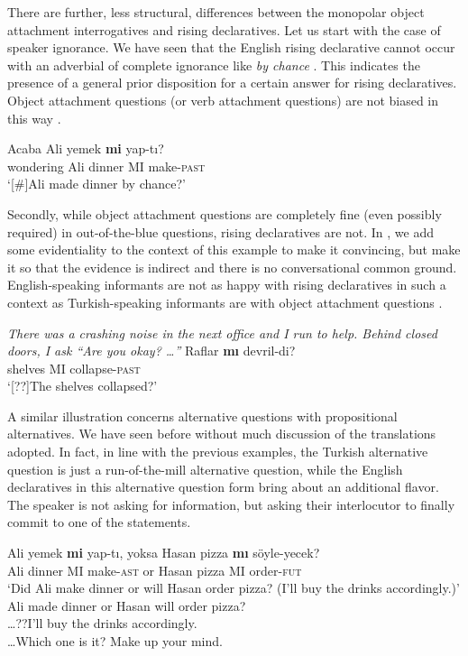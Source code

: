 \documentclass[output=paper,colorlinks,citecolor=brown]{langscibook}
\begin{document}
There are further, less structural, differences between the monopolar object attachment interrogatives and rising declaratives. Let us start with the case of speaker ignorance. We have seen that the English rising declarative cannot occur with an adverbial of complete ignorance like \textit{by chance} \citep{gunlogson} . This indicates the presence of a general prior disposition for a certain answer for rising declaratives. Object attachment questions (or verb attachment questions) are not biased in this way . 

\ea\label{wondering}
\gll Acaba Ali yemek \textbf{mi} yap-tı?\\
{wondering}	 Ali dinner MI make-\textsc{past}\\
\glt `[\#]Ali made dinner by chance?'
\z

Secondly, while object attachment questions are completely fine (even possibly required) in out-of-the-blue questions, rising declaratives are not. In , we add some evidentiality to the context of this example to make it convincing, but make it so that the evidence is indirect and there is no conversational common ground. English-speaking informants are not as happy with rising declaratives in such a context  as Turkish-speaking informants are with object attachment questions  \citep[also see ][]{gunlogson}. 

\ea\textit{There was a crashing noise in the next office and I run to help. Behind closed doors, I ask ``Are you okay? \ldots''} \label{cam}
\sn
\gll Raflar \textbf{mı} devril-di?\\
shelves MI collapse-\textsc{past} \\
\glt `[??]The shelves collapsed?'
\z
 
 A similar illustration concerns alternative questions with propositional alternatives. We have seen  before without much discussion of the translations adopted. In fact, in line with the previous examples, the Turkish alternative question is just a run-of-the-mill alternative question, while the English declaratives in this alternative question form bring about an additional flavor. The speaker is not asking for information, but asking their interlocutor to finally commit to one of the statements. 

\ea\label{accordingly}
\ea
\gll Ali yemek \textbf{mi} yap-tı, yoksa Hasan pizza \textbf{mı} s\"oyle-yecek?\\
Ali dinner MI make-\textsc{ast} or Hasan pizza MI order-\textsc{fut}\\
\glt `Did Ali make dinner or will Hasan order pizza? (I'll buy the drinks accordingly.)'
\ex
Ali made dinner or Hasan will order pizza? \\
\ldots ??I'll buy the drinks accordingly. \\
\ldots Which one is it? Make up your mind.
\z
\z
 
\end{document}

